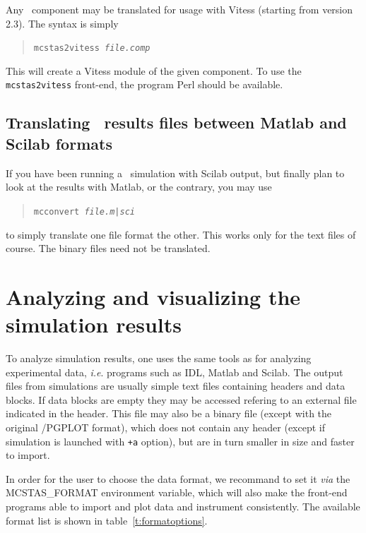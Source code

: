 Any \MCS\ component may be translated for usage with Vitess (starting from version 2.3). The syntax is simply 
\begin{quote}
  \texttt{mcstas2vitess {\it file.comp\/}}
\end{quote}
This will create a Vitess module of the given component.
To use the \verb+mcstas2vitess+ front-end, the program Perl should be available.

\subsection{Translating \MCS\ results files between Matlab and Scilab formats}
\label{s:mcconvert}
 

If you have been running a \MCS\ simulation with Scilab output, but finally plan to look at the results with Matlab, or the contrary, you may use
\begin{quote}
  \texttt{mcconvert {\it file.{m|sci}\/}}
\end{quote}
to simply translate one file format the other. This works only for the text files of course. The binary files need not be translated.

\section{Analyzing and visualizing the simulation results}
\label{s:analyze}

To analyze simulation results, one uses the same tools as for analyzing
experimental data, \textit{i.e}. programs such as IDL, Matlab and Scilab.
The output files from simulations are usually simple text files containing headers and data blocks. If data blocks are empty they may be accessed refering to an external file indicated in the header. This file may also be a binary file (except with the original \MCS /PGPLOT format), which does not contain any header (except if simulation is launched with \verb|+a| option), but are in turn smaller in size and faster to import. 

In order for the user to choose the data format, we recommand to set it {\it via} the MCSTAS\_FORMAT environment variable, which will also make the front-end programs able to import and plot data and instrument consistently. The available format list is shown in table~\ref{t:formatoptions}. 


